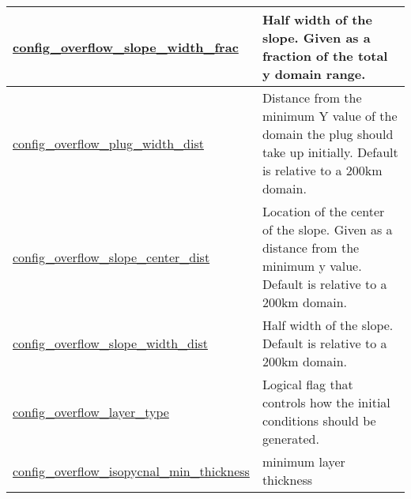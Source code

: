 {\begin{center}
\begin{longtable}{| p{2.0in} || p{4.0in} |}
    \hline
    \hyperref[subsec:nm_sec_config_overflow_slope_width_frac]{config\_overflow\_slope\_width\_\-frac} & Half width of the slope. Given as a fraction of the total y domain range. \\
    \hline
    \hyperref[subsec:nm_sec_config_overflow_plug_width_dist]{config\_overflow\_plug\_width\_\-dist} & Distance from the minimum Y value of the domain the plug should take up initially. Default is relative to a 200km domain. \\
    \hline
    \hyperref[subsec:nm_sec_config_overflow_slope_center_dist]{config\_overflow\_slope\_center\_\-dist} & Location of the center of the slope. Given as a distance from the minimum y value. Default is relative to a 200km domain. \\
    \hline
    \hyperref[subsec:nm_sec_config_overflow_slope_width_dist]{config\_overflow\_slope\_width\_\-dist} & Half width of the slope. Default is relative to a 200km domain. \\
    \hline
    \hyperref[subsec:nm_sec_config_overflow_layer_type]{config\_overflow\_layer\_type} & Logical flag that controls how the initial conditions should be generated. \\
    \hline
    \hyperref[subsec:nm_sec_config_overflow_isopycnal_min_thickness]{config\_overflow\_isopycnal\_\-min\_thickness} & minimum layer thickness \\
    \hline
\end{longtable}
\end{center}
}
